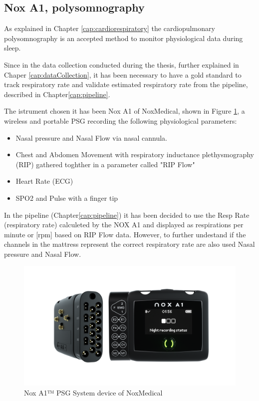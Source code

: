 \subsection{Nox A1, polysomnography} \label{NOXA1}
As explained in Chapter \ref{cap:cardiorespiratory} the cardiopulmonary polysomnography is an accepted method to monitor physiological data during sleep.

Since in the data collection conducted during the thesis, further explained in Chaper \ref{cap:dataCollection}, it has been necessary to have a gold standard to track respiratory rate and validate estimated respiratory rate from the pipeline, described in Chapter\ref*{cap:pipeline}.

The istrument chosen it has been Nox A1 of NoxMedical, shown in Figure \ref{fig:NOXA1}, a wireless and portable PSG recording the following physiological parameters: 

\begin{itemize}
    \item Nasal pressure and Nasal Flow via nasal cannula.
    \item Chest and Abdomen Movement with respiratory inductance plethysmography (RIP) gathered toghther in a parameter called "RIP Flow"
    \item Heart Rate (ECG)
    \item SPO2 and Pulse with a finger tip
\end{itemize}

In the pipeline (Chapter\ref*{cap:pipeline}) it has been decided to use the Resp Rate (respiratory rate) calculeted by the NOX A1 and displayed as respirations per minute or [rpm] based on RIP Flow data.
However, to further undestand if the channels in the mattress represent the correct respiratory rate are also used Nasal pressure and Nasal Flow.

\begin{figure}[H]
    \centering
    \includegraphics[width=\textwidth]{img/1.png}
    \caption{Nox A1™ PSG System device of NoxMedical}
    \label{fig:NOXA1}
\end{figure}

